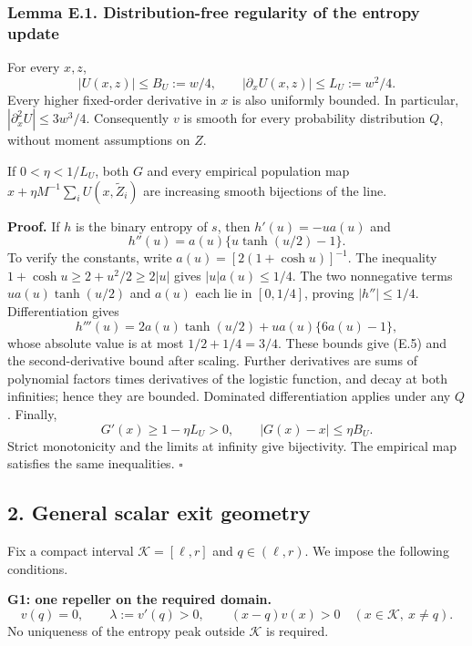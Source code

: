 \subsubsection{Lemma E.1. Distribution-free regularity of the entropy
update}\label{scalar_exit-lemma-e.1.-distribution-free-regularity-of-the-entropy-update}

For every \(x,z\), \[
|U(x,z)|\le B_U:=w/4,\qquad
|\partial_xU(x,z)|\le L_U:=w^2/4.
\tag{E.5}
\] Every higher fixed-order derivative in \(x\) is also uniformly
bounded. In particular, \(|\partial_x^2 U|\le 3w^3/4\). Consequently
\(v\) is smooth for every probability distribution \(Q\), without moment
assumptions on \(Z\).

If \(0<\eta<1/L_U\), both \(G\) and every empirical population map
\(x+\eta M^{-1}\sum_i U(x,\widetilde Z_i)\) are increasing smooth
bijections of the line.

\textbf{Proof.} If \(h\) is the binary entropy of \(s\), then
\(h'(u)=-ua(u)\) and \[
h''(u)=a(u)\{u\tanh(u/2)-1\}.
\] To verify the constants, write \(a(u)=[2(1+\cosh u)]^{-1}\). The
inequality \(1+\cosh u\ge2+u^2/2\ge2|u|\) gives \(|u|a(u)\le1/4\). The
two nonnegative terms \(ua(u)\tanh(u/2)\) and \(a(u)\) each lie in
\([0,1/4]\), proving \(|h''|\le1/4\). Differentiation gives \[
h'''(u)=2a(u)\tanh(u/2)+ua(u)\{6a(u)-1\},
\] whose absolute value is at most \(1/2+1/4=3/4\). These bounds give
(E.5) and the second-derivative bound after scaling. Further derivatives
are sums of polynomial factors times derivatives of the logistic
function, and decay at both infinities; hence they are bounded.
Dominated differentiation applies under any \(Q\). Finally, \[
G'(x)\ge1-\eta L_U>0,\qquad |G(x)-x|\le\eta B_U.
\] Strict monotonicity and the limits at infinity give bijectivity. The
empirical map satisfies the same inequalities. \(\square\)

\subsection{2. General scalar exit
geometry}\label{scalar_exit-general-scalar-exit-geometry}

Fix a compact interval \(\mathcal K=[\ell,r]\) and \(q\in(\ell,r)\). We
impose the following conditions.

\textbf{G1: one repeller on the required domain.} \[
v(q)=0,\qquad \lambda:=v'(q)>0,\qquad
(x-q)v(x)>0\quad(x\in\mathcal K,\ x\ne q).
\tag{E.6}
\] No uniqueness of the entropy peak outside \(\mathcal K\) is required.

